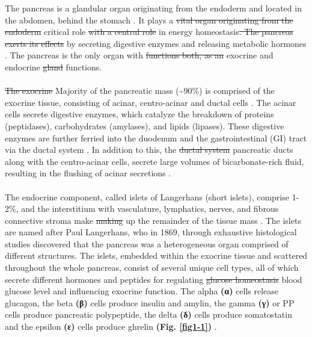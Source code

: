The pancreas is a glandular organ originating from the endoderm and located in the abdomen, behind the stomach \textbf{\cite{shih_pancreas_2013}}. It plays a \st{vital organ originating from the endoderm} critical role \st{with a central role} in energy homeostasis\st{. The pancreas exerts its effects} by secreting digestive enzymes and releasing metabolic hormones \textbf{\cite{kimmel_molecular_2010, baron_single-cell_2016}}. The pancreas is the only organ with \st{functions both, as an} exocrine and endocrine \st{gland} functions.  
\\\\
\st{The exocrine} Majority of the pancreatic mass (\textasciitilde 90\%) is comprised of the exocrine tissue, consisting of acinar, centro-acinar and ductal cells \textbf{\cite{pandiri_overview_2014}}. The acinar cells secrete digestive enzymes, which catalyze the breakdown of proteins (peptidases), carbohydrates (amylases), and lipids (lipases). These digestive enzymes are further ferried into the duodenum and the gastrointestinal (GI) tract via the ductal system \textbf{\cite{shih_pancreas_2013, baron_single-cell_2016}}.  In addition to this, the \st{ductal system} pancreatic ducts along with the centro-acinar cells, secrete large volumes of bicarbonate-rich fluid, resulting in the flushing of acinar secretions \textbf{\cite{pandiri_overview_2014, low_pancreatic_2010}}. 
\\\\
The endocrine component, called islets of Langerhans (short islets), comprise 1-2\%, and the interstitium with vasculature, lymphatics, nerves, and fibrous connective stroma make \st{making} up the remainder of the tissue mass \textbf{\cite{pandiri_overview_2014}}. The islets are named after Paul Langerhans, who in 1869, through exhaustive histological studies discovered that the pancreas was a heterogeneous organ comprised of different structures. The islets, embedded within the exocrine tissue and scattered throughout the whole pancreas, consist of several unique cell types, all of which secrete different hormones and peptides for regulating \st{glucose homeostasis}  blood glucose level \textbf{\cite{shih_pancreas_2013, baron_single-cell_2016}} and influencing exocrine function.  The alpha \textbf{(α)} cells release glucagon, the beta \textbf{(β)} cells produce insulin and amylin, the gamma \textbf{(γ)} or PP cells produce pancreatic polypeptide, the delta \textbf{(δ)} cells produce somatostatin and the epsilon \textbf{(ε)} cells produce ghrelin \textbf{\cite{mastracci_endocrine_2012} (Fig. \ref{fig1-1})} . 
\\\\



